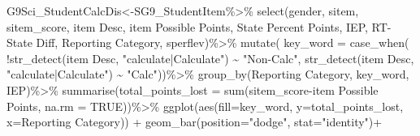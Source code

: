 \documentclass[
  letterpaper,
  DIV=11,
  numbers=noendperiod]{scrartcl}
\newenvironment{Shaded}{\begin{snugshade}}{\end{snugshade}}
\newcommand{\AttributeTok}[1]{\textcolor[rgb]{0.40,0.45,0.13}{#1}}
\newcommand{\ConstantTok}[1]{\textcolor[rgb]{0.56,0.35,0.01}{#1}}
\newcommand{\FunctionTok}[1]{\textcolor[rgb]{0.28,0.35,0.67}{#1}}
\newcommand{\NormalTok}[1]{\textcolor[rgb]{0.00,0.23,0.31}{#1}}
\newcommand{\OtherTok}[1]{\textcolor[rgb]{0.00,0.23,0.31}{#1}}
\newcommand{\SpecialCharTok}[1]{\textcolor[rgb]{0.37,0.37,0.37}{#1}}
\newcommand{\StringTok}[1]{\textcolor[rgb]{0.13,0.47,0.30}{#1}}
\begin{document}
\begin{Shaded}
\begin{Highlighting}[]
\NormalTok{G9Sci\_StudentCalcDis}\OtherTok{\textless{}{-}}\NormalTok{SG9\_StudentItem}\SpecialCharTok{\%\textgreater{}\%}
  \FunctionTok{select}\NormalTok{(gender, sitem, sitem\_score, }\StringTok{\textasciigrave{}}\AttributeTok{item Desc}\StringTok{\textasciigrave{}}\NormalTok{, }\StringTok{\textasciigrave{}}\AttributeTok{item Possible Points}\StringTok{\textasciigrave{}}\NormalTok{, }\StringTok{\textasciigrave{}}\AttributeTok{State Percent Points}\StringTok{\textasciigrave{}}\NormalTok{, IEP, }\StringTok{\textasciigrave{}}\AttributeTok{RT{-}State Diff}\StringTok{\textasciigrave{}}\NormalTok{, }\StringTok{\textasciigrave{}}\AttributeTok{Reporting Category}\StringTok{\textasciigrave{}}\NormalTok{, }\StringTok{\textasciigrave{}}\AttributeTok{sperflev}\StringTok{\textasciigrave{}}\NormalTok{)}\SpecialCharTok{\%\textgreater{}\%}
  \FunctionTok{mutate}\NormalTok{( }\AttributeTok{key\_word =} \FunctionTok{case\_when}\NormalTok{(}
     \SpecialCharTok{!}\FunctionTok{str\_detect}\NormalTok{(}\StringTok{\textasciigrave{}}\AttributeTok{item Desc}\StringTok{\textasciigrave{}}\NormalTok{, }\StringTok{"calculate|Calculate"}\NormalTok{) }\SpecialCharTok{\textasciitilde{}} \StringTok{"Non{-}Calc"}\NormalTok{,}
     \FunctionTok{str\_detect}\NormalTok{(}\StringTok{\textasciigrave{}}\AttributeTok{item Desc}\StringTok{\textasciigrave{}}\NormalTok{, }\StringTok{"calculate|Calculate"}\NormalTok{) }\SpecialCharTok{\textasciitilde{}} \StringTok{"Calc"}\NormalTok{))}\SpecialCharTok{\%\textgreater{}\%}
  \FunctionTok{group\_by}\NormalTok{(}\StringTok{\textasciigrave{}}\AttributeTok{Reporting Category}\StringTok{\textasciigrave{}}\NormalTok{, }\StringTok{\textasciigrave{}}\AttributeTok{key\_word}\StringTok{\textasciigrave{}}\NormalTok{, }\StringTok{\textasciigrave{}}\AttributeTok{IEP}\StringTok{\textasciigrave{}}\NormalTok{)}\SpecialCharTok{\%\textgreater{}\%}
  \FunctionTok{summarise}\NormalTok{(}\AttributeTok{total\_points\_lost =} \FunctionTok{sum}\NormalTok{(}\StringTok{\textasciigrave{}}\AttributeTok{sitem\_score}\StringTok{\textasciigrave{}}\SpecialCharTok{{-}}\StringTok{\textasciigrave{}}\AttributeTok{item Possible Points}\StringTok{\textasciigrave{}}\NormalTok{, }\AttributeTok{na.rm =} \ConstantTok{TRUE}\NormalTok{))}\SpecialCharTok{\%\textgreater{}\%}
 \FunctionTok{ggplot}\NormalTok{(}\FunctionTok{aes}\NormalTok{(}\AttributeTok{fill=}\StringTok{\textasciigrave{}}\AttributeTok{key\_word}\StringTok{\textasciigrave{}}\NormalTok{, }\AttributeTok{y=}\NormalTok{total\_points\_lost, }\AttributeTok{x=}\StringTok{\textasciigrave{}}\AttributeTok{Reporting Category}\StringTok{\textasciigrave{}}\NormalTok{)) }\SpecialCharTok{+} \FunctionTok{geom\_bar}\NormalTok{(}\AttributeTok{position=}\StringTok{"dodge"}\NormalTok{, }\AttributeTok{stat=}\StringTok{"identity"}\NormalTok{)}\SpecialCharTok{+}

\end{Highlighting}
\end{Shaded}
\end{document}
